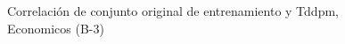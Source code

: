 \begin{figure}[H]
    \centering
    
    \caption{Correlación de conjunto original de entrenamiento y Tddpm, Economicos (B-3)}
    \label{pairwise-economicos-b-3-tddpm_mlp}
\end{figure}